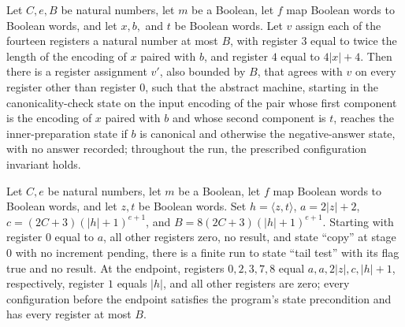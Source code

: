 \begin{lemma}
\label{Complexity.comp_canonical_run}
\leanok
{}
Let $C,e,B$ be natural numbers, let $m$ be a Boolean, let $f$ map Boolean words to
Boolean words, and let $x,b,$ and $t$ be Boolean words. Let $v$ assign each of the
fourteen registers a natural number at most $B$, with register $3$ equal to twice the
length of the encoding of $x$ paired with $b$, and register $4$ equal to $4|x|+4$. Then
there is a register assignment $v'$, also bounded by $B$, that agrees with $v$ on every
register other than register $0$, such that the abstract machine, starting in the
canonicality-check state on the input encoding of the pair whose first component is the
encoding of $x$ paired with $b$ and whose second component is $t$, reaches the
inner-preparation state if $b$ is canonical and otherwise the negative-answer state,
with no answer recorded; throughout the run, the prescribed configuration invariant
holds.
\end{lemma}

\begin{lemma}
\label{Complexity.comp_outer_prepare}
\leanok
{}
Let $C,e$ be natural numbers, let $m$ be a Boolean, let $f$ map Boolean words to Boolean
words, and let $z,t$ be Boolean words. Set $h=\langle z,t\rangle$, $a=2|z|+2$,
$c=(2C+3)(|h|+1)^{e+1}$, and $B=8(2C+3)(|h|+1)^{e+1}$. Starting with register $0$ equal
to $a$, all other registers zero, no result, and state “copy” at stage $0$ with no
increment pending, there is a finite run to state “tail test” with its flag true and no
result. At the endpoint, registers $0,2,3,7,8$ equal $a,a,2|z|,c,|h|+1$, respectively,
register $1$ equals $|h|$, and all other registers are zero; every configuration before
the endpoint satisfies the program’s state precondition and has every register at most
$B$.
\end{lemma}

